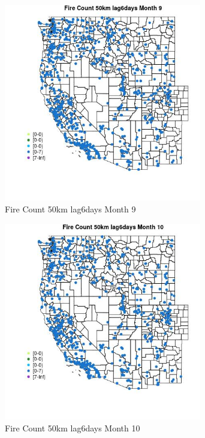 \begin{figure} 
\centering  
\includegraphics[width=0.77\textwidth]{Code_Outputs/Report_ML_input_PM25_Step4_part_e_de_duplicated_aves_compiled_2019-05-21wNAs_MapObsMo9Fire_Count_50km_lag6days.jpg} 
\caption{\label{fig:Report_ML_input_PM25_Step4_part_e_de_duplicated_aves_compiled_2019-05-21wNAsMapObsMo9Fire_Count_50km_lag6days}Fire Count 50km lag6days Month 9} 
\end{figure} 
 

\begin{figure} 
\centering  
\includegraphics[width=0.77\textwidth]{Code_Outputs/Report_ML_input_PM25_Step4_part_e_de_duplicated_aves_compiled_2019-05-21wNAs_MapObsMo10Fire_Count_50km_lag6days.jpg} 
\caption{\label{fig:Report_ML_input_PM25_Step4_part_e_de_duplicated_aves_compiled_2019-05-21wNAsMapObsMo10Fire_Count_50km_lag6days}Fire Count 50km lag6days Month 10} 
\end{figure} 
 

